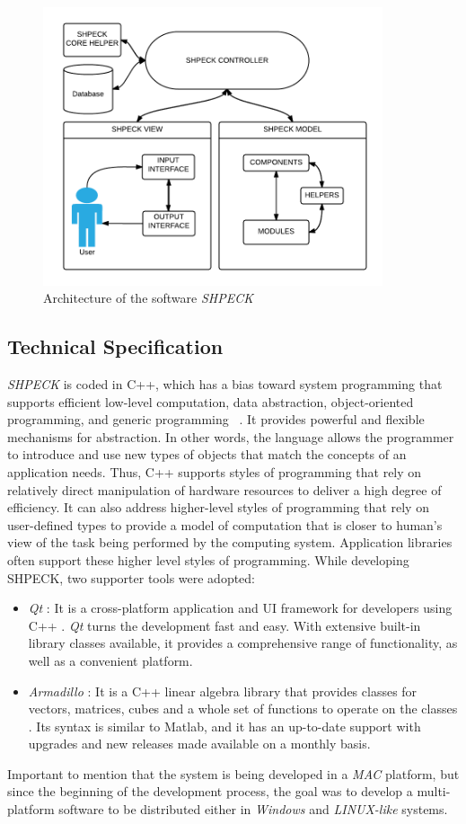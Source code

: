\begin{figure}[ht!]
\centering
\includegraphics[width=100mm]{figures/shpeck-architecture.png}
\caption{Architecture of the software \emph{SHPECK}}
\label{fig:shpeck-architecture}
\end{figure}

\subsection{Technical Specification}
\emph{SHPECK} is coded in C++, which has a bias toward system programming that supports efficient low-level computation, data abstraction, object-oriented programming, and generic programming \cite{Dale:04}~\cite{Stroustrup:97}. It provides powerful and flexible mechanisms for abstraction. In other words, the language allows the programmer to introduce and use new types of objects that match the concepts of an application needs. Thus, C++ supports styles of programming that rely on relatively direct manipulation of hardware resources to deliver a high degree of efficiency. It can also address higher-level styles of programming that rely on user-defined types to provide a model of computation that is closer to human's view of the task being performed by the computing system. Application libraries often support these higher level styles of programming. While developing SHPECK, two supporter tools were adopted:
\begin{itemize}
\item \emph{Qt} : It is a cross-platform application and UI framework for developers using C++  \cite{Qt:14}. \emph{Qt} turns the development fast and easy. With extensive built-in library classes available, it provides a comprehensive range of functionality, as well as a convenient platform.
\item \emph{Armadillo} : It is a C++ linear algebra library that provides classes for vectors, matrices, cubes and a whole set of functions to operate on the classes \cite{arma:14}. Its syntax is similar to Matlab, and it has an up-to-date support with upgrades and new releases made available on a monthly basis.
\end{itemize}
Important to mention that the system is being developed in a \emph{MAC} platform, but since the beginning of the development process, the goal was to develop a multi-platform software to be distributed either in \emph{Windows} and \emph{LINUX-like} systems.


